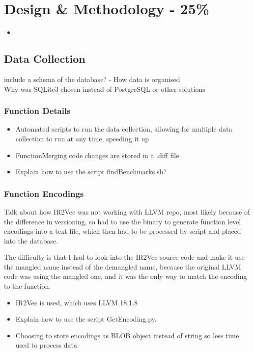 \chapter{Design \& Methodology - 25\%}

\begin{itemize}
    \item 
\end{itemize}


\section{Data Collection}
include a schema of the database?
 - How data is organised\\
Why was SQLite3 chosen instead of PostgreSQL or other solutions

\subsection{Function Details}
\begin{itemize}
 \item Automated scripts to run the data collection, allowing for multiple data collection to run at any time, speeding it up
 \item FunctionMerging code changes are stored in a .diff file
 \item Explain how to use the script findBenchmarks.sh?
\end{itemize}


\subsection{Function Encodings}
Talk about how IR2Vec was not working with LLVM repo, most likely because of the difference in versioning, so had to use the binary to generate function level encodings into a text file, which then had to be processed by script and placed into the database.

The difficulty is that I had to look into the IR2Vec source code and make it use the mangled name instead of the demangled name, because the original LLVM code was using the mangled one, and it was the only way to match the encoding to the function.

\begin{itemize}
 \item IR2Vec is used, which uses LLVM 18.1.8
 \item Explain how to use the script GetEncoding.py.
 \item Choosing to store encodings as BLOB object instead of string so less time used to process data
\end{itemize}


